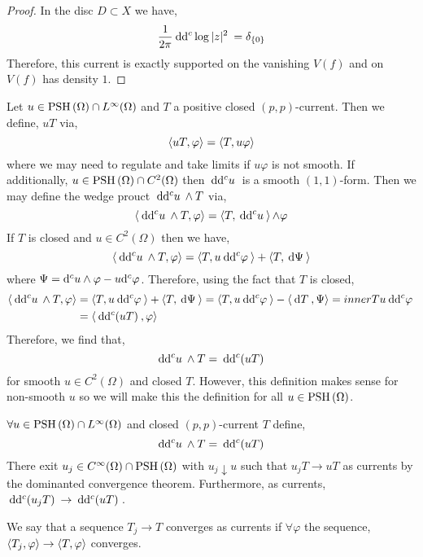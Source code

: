 \documentclass[12pt]{extarticle}
\renewcommand{\d}[1]{\: \mathrm{d}#1 \:}
\theoremstyle{definition}
\newenvironment{definition}[1][Definition:]{\begin{trivlist}
\item[\hskip \labelsep {\bfseries #1}]}{\end{trivlist}}
\begin{document}
\begin{proof}
In the disc $D \subset X$ we have,
\[ \frac{1}{2 \pi} \d{\dc \log{|z|^2}} = \delta_{\{ 0 \}} \]
Therefore, this current is exactly supported on the vanishing $V(f)$ and on $V(f)$ has density $1$. 
\end{proof}

\begin{definition}
Let $u \in \mathrm{PSH}\left( \Omega \right) \cap L^\infty(\Omega)$ and $T$ a positive closed $(p,p)$-current. Then we define, $u T$ via,
\[ \left< uT, \varphi \right> = \left< T, u \varphi \right> \]
where we may need to regulate and take limits if $u \varphi$ is not smooth. If additionally, $u \in \mathrm{PSH}\left( \Omega \right) \cap C^2(\Omega)$ then $\d{\dc u}$ is a smooth $(1,1)$-form. Then we may define the wedge prouct $\d{\dc{u}} \wedge T$ via,
\[ \inner{\d{\dc{u}} \wedge T}{\varphi} = \inner{T}{\d{\dc{u}}}{\wedge \varphi} \]
If $T$ is closed and $u \in C^2(\Omega)$ then we have,
\[ \inner{\d{\dc{u}} \wedge T}{\varphi} = \inner{T}{u \d{\dc{\varphi}}} + \inner{T}{\d{\Psi}} \]
where $\Psi = \mathrm{d}^c{u} \wedge \varphi - u \mathrm{d}^c{\varphi}$. 
Therefore, using the fact that $T$ is closed,
\begin{align*}
\inner{\d{\dc{u}} \wedge T}{\varphi} & = \inner{T}{u \d{\dc{\varphi}}} + \inner{T}{\d{\Psi}} = \inner{T}{u \d{\dc{\varphi}}} - \inner{\d{T}}{\Psi} = inner{T}{u \d{\dc{\varphi}}} 
\\
& = \inner{\d{\dc{(u T)}}}{\varphi}
\end{align*}
Therefore, we find that,
\[ \d{\dc{u}} \wedge T = \d{\dc(u T)} \]
for smooth $u \in C^2(\Omega)$ and closed $T$. However, this definition makes sense for non-smooth $u$ so we will make this the definition for all $u \in \mathrm{PSH}\left( \Omega \right)$. 
\end{definition}


\begin{definition}
$\forall u \in \mathrm{PSH}\left( \Omega \right) \cap L^\infty(\Omega)$ and closed $(p,p)$-current $T$ define,
\[ \d{\dc{u}} \wedge T = \d{\dc{(uT)}} \] 
There exit $u_j \in C^\infty(\Omega) \cap \mathrm{PSH}\left( \Omega \right)$ with $u_j \downarrow u$ such that $u_j T \to u T$ as currents by the dominanted convergence theorem. Furthermore, as currents, $\d{\dc{(u_j T)}} \to \d{\dc{(uT)}}$. 
\end{definition}

\begin{definition}
We say that a sequence $T_j \to T$ converges as currents if $\forall \varphi$ the sequence, $\left< T_j, \varphi \right> \to \left< T, \varphi \right>$ converges.  
\end{definition}
\end{document}
